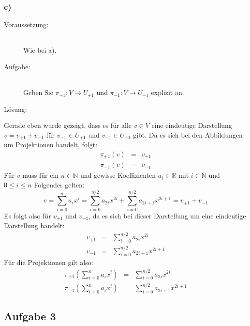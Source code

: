 \documentclass[10pt, a4paper]{article}
\begin{document}

	\subsubsection*{c)} %
	\label{ssub:c_}
	
		\begin{description}
			\item[Voraussetzung:] \hfill \\
				Wie bei a).
			\item[Aufgabe:] \hfill \\
				Geben Sie $\pi_{+1}:V\longrightarrow U_{+1}$ und $\pi_{-1}:V\longrightarrow U_{-1}$ explizit an.
			\item[Lösung:]
		\end{description}
		
		Gerade eben wurde gezeigt, dass es für alle $v \in V$ eine eindeutige Darstellung $v = v_{+1} + v_{-1}$ für $v_{+1} \in U_{+1}$ und $v_{-1} \in U_{-1}$ gibt. Da es sich bei den Abbildungen um Projektionen handelt, folgt:
		\begin{eqnarray*}
			\pi_{+1}(v) &=& v_{+1} \\
			\pi_{-1}(v) &=& v_{-1}
		\end{eqnarray*}
		Für $v$ muss für ein $n \in \mathbb{N}$ und gewisse Koeffizienten $a_i \in \mathbb{R}$ mit $i \in \mathbb{N}$ und $0 \leq i \leq n$ Folgendes gelten:
		\[
			v = \sum_{i=0}^n a_ix^i = \sum_{i=0}^{n/2} a_{2i}x^{2i} + \sum_{i=0}^{n/2} a_{2i+1}x^{2i+1} = v_{+1} + v_{-1}
		\]
		Es folgt also für $v_{+1}$ und $v_{-1}$, da es sich bei dieser Darstellung um eine eindeutige Darstellung handelt:
		\begin{eqnarray*}
			v_{+1} &=& \sum_{i=0}^{n/2} a_{2i}x^{2i} \\
			v_{-1} &=& \sum_{i=0}^{n/2} a_{2i+1}x^{2i+1}
		\end{eqnarray*}
		Für die Projektionen gilt also:
		\begin{eqnarray*}
			\pi_{+1}\left(\sum_{i=0}^n a_ix^i\right) &=& \sum_{i=0}^{n/2} a_{2i}x^{2i} \\
			\pi_{-1}\left(\sum_{i=0}^n a_ix^i\right) &=& \sum_{i=0}^{n/2} a_{2i+1}x^{2i+1}
		\end{eqnarray*}



	\newpage

	\subsection*{Aufgabe 3} %
	\label{sub:aufgabe_3}
	
\end{document}
